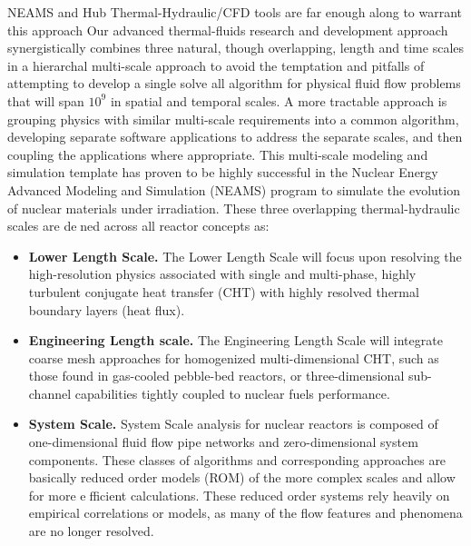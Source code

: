 NEAMS and Hub Thermal-Hydraulic/CFD tools are far enough along to warrant this approach
Our advanced thermal-fluids research and development approach synergistically combines three natural,
though overlapping, length and time scales in a hierarchal multi-scale approach to avoid the temptation and
pitfalls of attempting to develop a single solve all algorithm for physical fluid flow problems that will span
$10^{9}$ in spatial and temporal scales. A more tractable approach is grouping physics with similar multi-scale
requirements into a common algorithm, developing separate software applications to address the separate
scales, and then coupling the applications where appropriate. This multi-scale modeling and simulation
template has proven to be highly successful in the Nuclear Energy Advanced Modeling and Simulation
(NEAMS) program to simulate the evolution of nuclear materials under irradiation. These three overlapping
thermal-hydraulic scales are dened across all reactor concepts as:
\begin{itemize}
    \item \textbf{Lower Length Scale.} The Lower Length Scale will focus upon resolving the high-resolution physics
    associated with single and multi-phase, highly turbulent conjugate heat transfer (CHT) with highly
    resolved thermal boundary layers (heat flux).
    \item \textbf{Engineering Length scale.} The Engineering Length Scale will integrate coarse mesh approaches
    for homogenized multi-dimensional CHT, such as those found in gas-cooled pebble-bed reactors, or three-dimensional sub-channel capabilities tightly coupled to nuclear fuels performance.
    \item \textbf{System Scale.} System Scale analysis for nuclear reactors is composed of one-dimensional fluid flow
    pipe networks and zero-dimensional system components. These classes of algorithms and corresponding approaches are basically reduced order models (ROM) of the more complex scales and allow for more efficient calculations. These reduced order systems rely heavily on empirical correlations or models, as many of the flow features and phenomena are no longer resolved.
\end{itemize}

